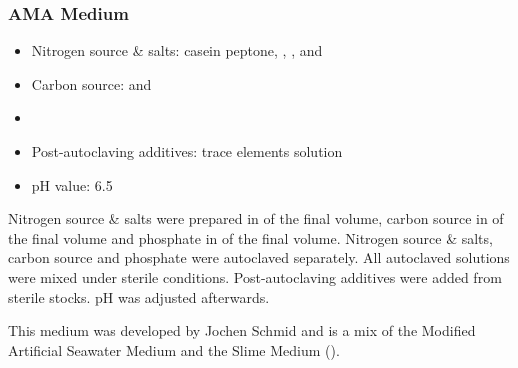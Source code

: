 \subsubsection{AMA Medium}
\begin{itemize}
	\item Nitrogen source \& salts:
		 casein peptone,
		 ,
		 ,
		  and
		 
	\item Carbon source:
		 \glc{} and
		 
	\item{} 
	\item Post-autoclaving additives:
		 trace elements solution
	\item pH value: \num{6.5}
\end{itemize}
Nitrogen source \& salts were prepared in  of the final volume, carbon source in  of the final volume and phosphate in  of the final volume. Nitrogen source \& salts, carbon source and phosphate were autoclaved separately. All autoclaved solutions were mixed under sterile conditions. Post-autoclaving additives were added from sterile stocks. pH was adjusted afterwards.

This medium was developed by Jochen Schmid and is a mix of the Modified Artificial Seawater Medium \cite{CCAP2008} and the Slime Medium ().

